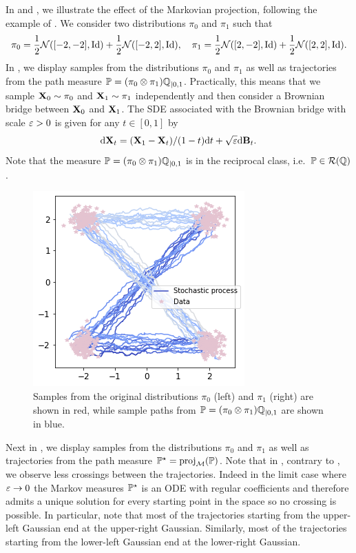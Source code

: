 \documentclass{article}
\begin{document}
In  and , we illustrate the effect of the Markovian projection, following the example of \citep{liu2022rectified}. We consider two distributions $\pi_0$ and $\pi_1$ such that 
\begin{equation}
    \pi_0 = \frac{1}{2}\mathcal{N}([-2,-2], \mathrm{Id}) + \frac{1}{2} \mathcal{N}([-2,2], \mathrm{Id}) , \quad \pi_1 = \frac{1}{2} \mathcal{N}([2,-2], \mathrm{Id}) +\frac{1}{2}\mathcal{N}([2,2], \mathrm{Id}) .
\end{equation}
In , we display samples from the distributions $\pi_0$ and $\pi_1$ as well as trajectories from the path measure $\mathbb{P} = (\pi_0 \otimes \pi_1) \mathbb{Q}_{|0,1}$. Practically, this means that we sample $\mathbf{X}_0 \sim \pi_0$ and $\mathbf{X}_1 \sim \pi_1$ independently and then consider a Brownian bridge between $\mathbf{X}_0$ and $\mathbf{X}_1$. The SDE associated with the Brownian bridge with scale $\varepsilon >0$ is given for any $t \in [0,1]$ by
\begin{equation}
\label{eq:brownian_bridge_appendix}
    \rmd \bfX_t = (\bfX_1 - \bfX_t)/ (1-t) \rmd t + \sqrt{\vareps} \rmd \bfB_t . 
\end{equation}
Note that the measure $\mathbb{P} = (\pi_0 \otimes \pi_1) \mathbb{Q}_{|0,1}$ is in the reciprocal class, i.e.~$\mathbb{P} \in \mathcal{R}(\mathbb{Q})$. 

\begin{figure}[H]
    \centering
    \includegraphics[width=.4\linewidth]{img/original_coupling.png}
    \caption{Samples from the original distributions $\pi_0$ (left) and $\pi_1$ (right) are shown in red, while sample paths from $\mathbb{P} = (\pi_0 \otimes \pi_1) \mathbb{Q}_{|0,1}$ are shown in blue.}
    \label{fig:original_coupling}
\end{figure}

Next in , we display samples from the distributions $\pi_0$ and $\pi_1$ as well as trajectories from the path measure $\mathbb{P}^\star = \mathrm{proj}_{\mathcal{M}}(\mathbb{P})$. Note that in , contrary to , we observe less crossings between the trajectories. Indeed in the limit case where $\varepsilon \to 0$ the Markov measures $\mathbb{P}^\star$ is an ODE with regular coefficients and therefore admits a unique solution for every starting point in the space so no crossing is possible. In particular, note that most of the trajectories starting from the upper-left Gaussian end at the upper-right Gaussian. Similarly, most of the trajectories starting from the lower-left Gaussian end at the lower-right Gaussian.
\end{document}
